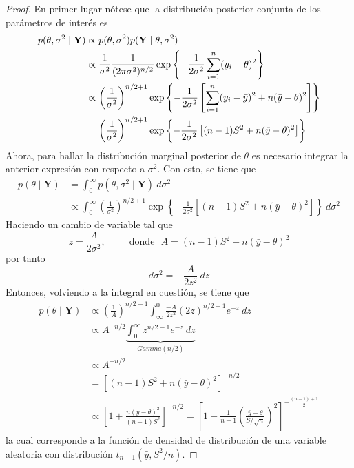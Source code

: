 \begin{proof}
En primer lugar nótese que la distribución posterior conjunta de los parámetros de interés es
\begin{align}\label{prop_theta_sigma2}
p(\theta,\sigma^2 \mid \mathbf{Y})& \propto p(\theta,\sigma^2)p(\mathbf{Y} \mid \theta,\sigma^2) \notag \\
& \propto \frac{1}{\sigma^2}\frac{1}{(2\pi\sigma^2)^{n/2}}\exp\left\{-\frac{1}{2\sigma^2}\sum_{i=1}^n(y_i-\theta)^2\right\} \notag\\
& \propto \left(\frac{1}{\sigma^2}\right)^{n/2+1}
\exp\left\{-\frac{1}{2\sigma^2}\left[\sum_{i=1}^n(y_i-\bar{y})^2+n(\bar{y}-\theta)^2\right]\right\} \notag \\
&= \left(\frac{1}{\sigma^2}\right)^{n/2+1}
\exp\left\{-\frac{1}{2\sigma^2}\left[(n-1)S^2+n(\bar{y}-\theta)^2\right]\right\}
\end{align}
Ahora, para hallar la distribución marginal posterior de $\theta$ es necesario integrar la anterior expresión con respecto a $\sigma^2$. Con esto, se tiene que
\begin{align*}
p(\theta \mid \mathbf{Y})&= \int_0^{\infty} p(\theta,\sigma^2 \mid \mathbf{Y}) \ d\sigma^2 \\
&\propto \int_0^{\infty} \left(\frac{1}{\sigma^2}\right)^{n/2+1}
\exp\left\{-\frac{1}{2\sigma^2}\left[(n-1)S^2+n(\bar{y}-\theta)^2\right]\right\} \ d\sigma^2
\end{align*}
Haciendo un cambio de variable tal que
\begin{equation*}
z=\frac{A}{2\sigma^2}, \ \ \ \ \ \ \ \ \ \ \ \text{donde} \ \ \ A=(n-1)S^2+n(\bar{y}-\theta)^2
\end{equation*}
por tanto
\begin{equation*}
d\sigma^2=-\frac{A}{2z^2} \ dz
\end{equation*}
Entonces, volviendo a la integral en cuestión, se tiene que
\begin{align*}
p(\theta \mid \mathbf{Y})& \propto
\left(\frac{1}{A}\right)^{n/2+1}\int_{\infty}^{0} \frac{-A}{2z^2} (2z)^{n/2+1}e^{-z} \ dz \\
&\propto A^{-n/2}\underbrace{\int_{0}^{\infty} z^{n/2-1}e^{-z}\ dz}_{Gamma(n/2)}\\
&\propto A^{-n/2}\\
&= [(n-1)S^2+n(\bar{y}-\theta)^2]^{-n/2}\\
&\propto \left[1+\frac{n(\bar{y}-\theta)^2}{(n-1)S^2}\right]^{-n/2}
=\left[1+\frac{1}{n-1}\left(\frac{\bar{y}-\theta}{S/\sqrt{n}}\right)^2\right]^{-\frac{(n-1)+1}{2}}
\end{align*}
la cual corresponde a la función de densidad de distribución de una variable aleatoria con distribución $t_{n-1}(\bar{y},S^2/n)$.
\end{proof}

